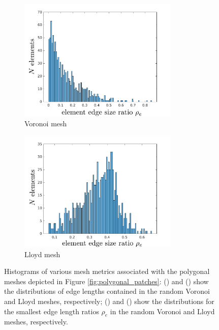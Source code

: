 \begin{figure}[!h]
    \begin{subfigure}[b]{0.49\linewidth}
            \centering
            \includegraphics[width=3.0in]{figures/patch_edge_ratios.pdf}
    			\caption{Voronoi mesh \label{fig:patch_edge_ratios}}
    \end{subfigure}
	\begin{subfigure}[b]{0.49\linewidth}
            \centering
            \includegraphics[width=3.0in]{figures/lloyd_edge_ratios.pdf}
    			\caption{Lloyd mesh \label{fig:lloyd_edge_ratios}}
    \end{subfigure}
    \caption{Histograms of various mesh metrics associated with the polygonal meshes depicted in Figure \ref{fig:polygonal_patches}:  () and () show the distributions of edge lengths contained in the random Voronoi and Lloyd meshes, respectively; () and () show the distributions for the smallest edge length ratios $\rho_e$ in the random Voronoi and Lloyd meshes, respectively.}
\end{figure}

